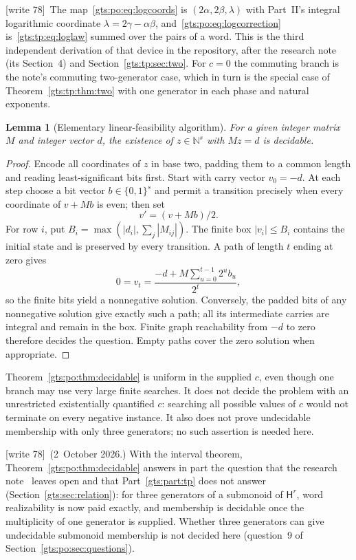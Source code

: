 \documentclass[11pt,letterpaper]{article}
\newtheorem{lemma}[theorem]{Lemma}
\theoremstyle{definition}
\theoremstyle{remark}
\newcommand{\N}{\mathbb N}
\newcommand{\HH}{\mathsf H}
\newcommand{\wtagb}{\textup{[write 78]}}
\begin{document}
\wtagb\ The map~\eqref{gts:po:eq:logcoords} is $(2\alpha,2\beta,\lambda)$ with Part~II's integral logarithmic coordinate $\lambda=2\gamma-\alpha\beta$, and~\eqref{gts:po:eq:logcorrection} is~\eqref{gts:tp:eq:loglaw} summed over the pairs of a word. This is the third independent derivation of that device in the repository, after the research note~\cite{repo-heis} (its Section~4) and Section~\ref{gts:tp:sec:two}. For $c=0$ the commuting branch is the note's commuting two-generator case, which in turn is the special case of Theorem~\ref{gts:tp:thm:two} with one generator in each phase and natural exponents.

\begin{lemma}[Elementary linear-feasibility algorithm]\label{gts:po:lem:linear}
For a given integer matrix $M$ and integer vector $d$, the existence of $z\in\N^s$ with $Mz=d$ is decidable.
\end{lemma}
\begin{proof}
Encode all coordinates of $z$ in base two, padding them to a common length and reading least-significant bits first. Start with carry vector $v_0=-d$. At each step choose a bit vector $b\in\{0,1\}^s$ and permit a transition precisely when every coordinate of $v+Mb$ is even; then set
\[
 v'=(v+Mb)/2.
\]
For row $i$, put $B_i=\max(|d_i|,\sum_j|M_{ij}|)$. The finite box $|v_i|\le B_i$ contains the initial state and is preserved by every transition. A path of length $t$ ending at zero gives
\[
 0=v_t=\frac{-d+M\sum_{u=0}^{t-1}2^u b_u}{2^t},
\]
so the finite bits yield a nonnegative solution. Conversely, the padded bits of any nonnegative solution give exactly such a path; all its intermediate carries are integral and remain in the box. Finite graph reachability from $-d$ to zero therefore decides the question. Empty paths cover the zero solution when appropriate.
\end{proof}

Theorem~\ref{gts:po:thm:decidable} is uniform in the supplied $c$, even though one branch may use very large finite searches. It does not decide the problem with an unrestricted existentially quantified $c$: searching all possible values of $c$ would not terminate on every negative instance. It also does not prove undecidable membership with only three generators; no such assertion is needed here.

\wtagb\ (2~October 2026.) With the interval theorem, Theorem~\ref{gts:po:thm:decidable} answers in part the question that the research note~\cite{repo-heis} leaves open and that Part~\ref{gts:part:tp} does not answer (Section~\ref{gts:sec:relation}): for three generators of a submonoid of $\HH^r$, word realizability is now paid exactly, and membership is decidable once the multiplicity of one generator is supplied. Whether three generators can give undecidable submonoid membership is not decided here (question~9 of Section~\ref{gts:po:sec:questions}).
\end{document}
